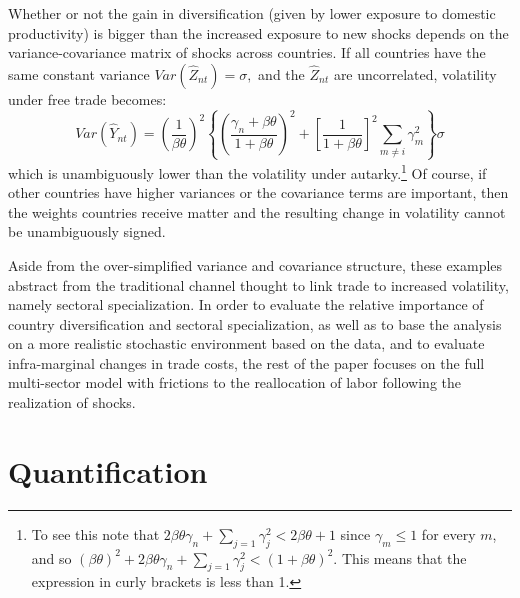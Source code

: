 \documentclass[12pt]{article}
\begin{document}
Whether or not the gain in diversification (given by lower exposure to
domestic productivity) is bigger than the increased exposure to new shocks
depends on the variance-covariance matrix of shocks across countries. If all
countries have the same constant variance $Var(\hat{Z}_{nt})=\sigma ,$ and
the $\hat{Z}_{nt}$ are uncorrelated, volatility under free trade becomes: 
\begin{equation*}
Var(\hat{Y}_{nt})=\left( \frac{1}{\beta \theta }\right) ^{2}\left\{ \left( 
\frac{\gamma _{n}+\beta \theta }{1+\beta \theta }\right) ^{2}+\left[ \frac{1%
}{1+\beta \theta }\right] ^{2}\sum_{m\neq i}\gamma _{m}^{2}\right\} \sigma
\end{equation*}%
which is unambiguously lower than the volatility under autarky.\footnote{%
To see this note that $2\beta \theta \gamma _{n}+\sum_{j=1}\gamma
_{j}^{2}<2\beta \theta +1$ since $\gamma _{m}\leq 1$ for every $m$, and so $%
\left( \beta \theta \right) ^{2}+2\beta \theta \gamma _{n}+\sum_{j=1}\gamma
_{j}^{2}<(1+\beta \theta )^{2}$. This means that the expression in curly
brackets is less than 1.} Of course, if other countries have higher
variances or the covariance terms are important, then the weights countries
receive matter and the resulting change in volatility cannot be
unambiguously signed.

Aside from the over-simplified variance and covariance structure, these
examples abstract from the traditional channel thought to link trade to
increased volatility, namely sectoral specialization. In order to evaluate
the relative importance of country diversification and sectoral
specialization, as well as to base the analysis on a more realistic
stochastic environment based on the data, and to evaluate infra-marginal
changes in trade costs, the rest of the paper focuses on the full
multi-sector model with frictions to the reallocation of labor following the
realization of shocks.

\section{Quantification}
\end{document}
